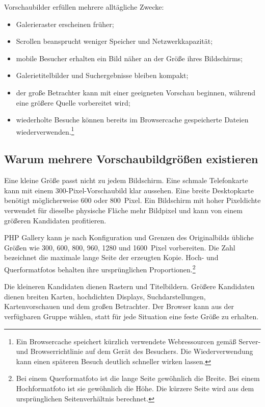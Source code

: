 \documentclass[11pt,a4paper]{article}
\begin{document}
Vorschaubilder erfüllen mehrere alltägliche Zwecke:

\begin{itemize}
  \item Galerieraster erscheinen früher;
  \item Scrollen beansprucht weniger Speicher und Netzwerkkapazität;
  \item mobile Besucher erhalten ein Bild näher an der Größe ihres Bildschirms;
  \item Galerietitelbilder und Suchergebnisse bleiben kompakt;
  \item der große Betrachter kann mit einer geeigneten Vorschau beginnen,
  während eine größere Quelle vorbereitet wird;
  \item wiederholte Besuche können bereits im Browsercache gespeicherte Dateien
  wiederverwenden.\footnote{Ein Browsercache speichert kürzlich verwendete
  Webressourcen gemäß Server- und Browserrichtlinie auf dem Gerät des Besuchers.
  Die Wiederverwendung kann einen späteren Besuch deutlich schneller wirken
  lassen.}
\end{itemize}

\subsection{Warum mehrere Vorschaubildgrößen existieren}

Eine kleine Größe passt nicht zu jedem Bildschirm. Eine schmale Telefonkarte
kann mit einem 300-Pixel-Vorschaubild klar aussehen. Eine breite Desktopkarte
benötigt möglicherweise 600 oder 800~Pixel. Ein Bildschirm mit hoher Pixeldichte
verwendet für dieselbe physische Fläche mehr Bildpixel und kann von einem
größeren Kandidaten profitieren.

PHP Gallery kann je nach Konfiguration und Grenzen des Originalbilds übliche
Größen wie 300, 600, 800, 960, 1280 und 1600~Pixel vorbereiten. Die Zahl
bezeichnet die maximale lange Seite der erzeugten Kopie. Hoch- und
Querformatfotos behalten ihre ursprünglichen Proportionen.\footnote{Bei einem
Querformatfoto ist die lange Seite gewöhnlich die Breite. Bei einem
Hochformatfoto ist sie gewöhnlich die Höhe. Die kürzere Seite wird aus dem
ursprünglichen Seitenverhältnis berechnet.}

Die kleineren Kandidaten dienen Rastern und Titelbildern. Größere Kandidaten
dienen breiten Karten, hochdichten Displays, Suchdarstellungen, Kartenvorschauen
und dem großen Betrachter. Der Browser kann aus der verfügbaren Gruppe wählen,
statt für jede Situation eine feste Größe zu erhalten.
\end{document}
